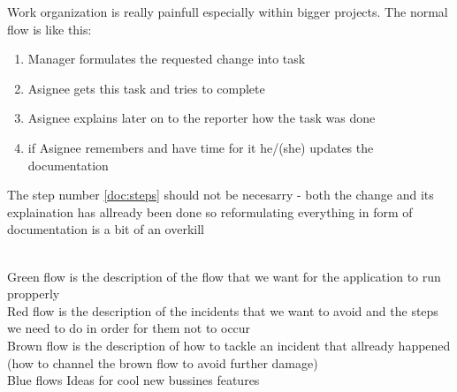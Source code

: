 \label{prob}
\label{prob:1}
Work organization is really painfull especially within bigger projects.
\label{prob:2}
The normal flow is like this:
\begin{enumerate}
  \item Manager formulates the requested change into task
  \item Asignee gets this task and tries to complete 
  \item Asignee explains later on to the reporter how the task was done
  \item if Asignee remembers and have time for it he/(she) updates the documentation\label{doc:steps}
\end{enumerate}
The step number \ref*{doc:steps} should not be necesarry - both the change and its explaination 
has allready been done so reformulating everything in form of documentation is a bit of an overkill

\label{sol}
\label{sol:1}
\secstarter
{}\label{sol:1:1}
\\Green flow is the description of the flow that we want for the application to run propperly
\label{sol:1:2}
\\Red flow is the description of the incidents that we want to avoid and the steps we need to do in order for them not to occur
\label{sol:1:3}
\\Brown flow is the description of how to tackle an incident that allready happened (how to channel the brown flow to avoid further damage)
\secend
{}\label{sol:2}
\secstarter
{}\label{sol:2:1}
\\Blue flows Ideas for cool new bussines features
\label{sol:2:2}
\secend

\label{uvp}
\label{uvp:1}



\label{channels}
\label{channels:1}
\label{channels:2}

\label{revenue}
\label{revenue:1}
\label{revenue:2}
\label{revenue:3}
\label{revenue:4}
\label{revenue:5}
\label{revenue:6}

\label{cost}
\label{cost:1}
\label{cost:2}

